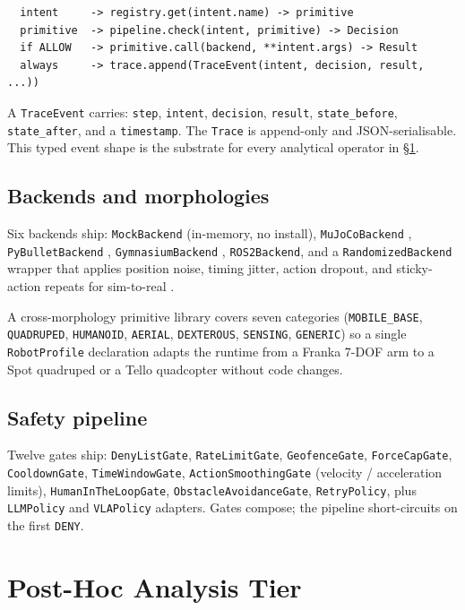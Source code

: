 \documentclass[11pt]{article}
\begin{document}
\begin{verbatim}
  intent     -> registry.get(intent.name) -> primitive
  primitive  -> pipeline.check(intent, primitive) -> Decision
  if ALLOW   -> primitive.call(backend, **intent.args) -> Result
  always     -> trace.append(TraceEvent(intent, decision, result, ...))
\end{verbatim}

A \texttt{TraceEvent} carries: \texttt{step}, \texttt{intent},
\texttt{decision}, \texttt{result}, \texttt{state\_before},
\texttt{state\_after}, and a \texttt{timestamp}. The
\texttt{Trace} is append-only and JSON-serialisable. This typed
event shape is the substrate for every analytical operator in
\S\ref{sec:posthoc}.

\subsection{Backends and morphologies}

Six backends ship: \texttt{MockBackend} (in-memory, no install),
\texttt{MuJoCoBackend} \citep{todorov2012mujoco},
\texttt{PyBulletBackend} \citep{coumans2016pybullet},
\texttt{GymnasiumBackend} \citep{towers2023gymnasium},
\texttt{ROS2Backend}, and a \texttt{RandomizedBackend} wrapper that
applies position noise, timing jitter, action dropout, and
sticky-action repeats for sim-to-real \citep{tobin2017dr}.

A cross-morphology primitive library covers seven categories
(\texttt{MOBILE\_BASE}, \texttt{QUADRUPED}, \texttt{HUMANOID},
\texttt{AERIAL}, \texttt{DEXTEROUS}, \texttt{SENSING},
\texttt{GENERIC}) so a single \texttt{RobotProfile} declaration
adapts the runtime from a Franka 7-DOF arm to a Spot quadruped or a
Tello quadcopter without code changes.

\subsection{Safety pipeline}

Twelve gates ship: \texttt{DenyListGate}, \texttt{RateLimitGate},
\texttt{GeofenceGate}, \texttt{ForceCapGate}, \texttt{Cooldown\-Gate},
\texttt{TimeWindowGate}, \texttt{ActionSmoothingGate} (velocity /
acceleration limits), \texttt{HumanInTheLoopGate}, \texttt{Obstacle\-Avoid\-anceGate},
\texttt{RetryPolicy}, plus \texttt{LLMPolicy} and \texttt{VLAPolicy}
adapters. Gates compose; the pipeline short-circuits on the first
\texttt{DENY}.

\section{Post-Hoc Analysis Tier}
\label{sec:posthoc}
\end{document}

